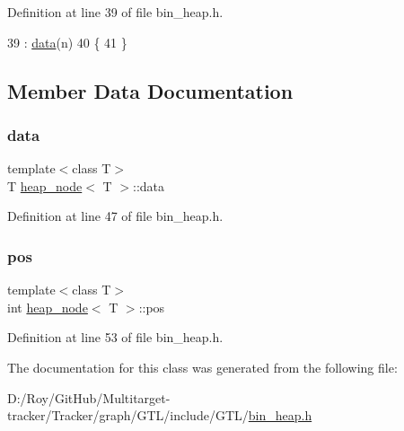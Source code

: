 Definition at line 39 of file bin\+\_\+heap.\+h.


\begin{DoxyCode}
39                           : \mbox{\hyperlink{classheap__node_ae37815e49df4d367e28ca4615b40e397}{data}}(n)
40     \{
41     \}
\end{DoxyCode}


\subsection{Member Data Documentation}
\mbox{\label{classheap__node_ae37815e49df4d367e28ca4615b40e397}} 
\subsubsection{\texorpdfstring{data}{data}}
{\footnotesize\ttfamily template$<$class T$>$ \\
T \mbox{\hyperlink{classheap__node}{heap\+\_\+node}}$<$ T $>$\+::data}



Definition at line 47 of file bin\+\_\+heap.\+h.

\mbox{\label{classheap__node_a6d6ebca320ede4a2dc3749caf0519534}} 
\subsubsection{\texorpdfstring{pos}{pos}}
{\footnotesize\ttfamily template$<$class T$>$ \\
int \mbox{\hyperlink{classheap__node}{heap\+\_\+node}}$<$ T $>$\+::pos}



Definition at line 53 of file bin\+\_\+heap.\+h.



The documentation for this class was generated from the following file\+:\begin{DoxyCompactItemize}
\item 
D\+:/\+Roy/\+Git\+Hub/\+Multitarget-\/tracker/\+Tracker/graph/\+G\+T\+L/include/\+G\+T\+L/\mbox{\hyperlink{bin__heap_8h}{bin\+\_\+heap.\+h}}\end{DoxyCompactItemize}
